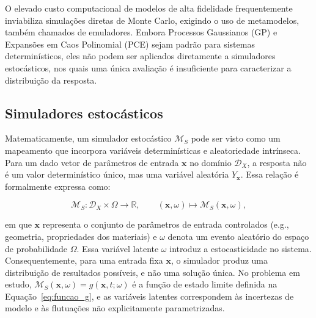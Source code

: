 
O elevado custo computacional de modelos de alta fidelidade frequentemente inviabiliza simulações diretas de Monte Carlo, exigindo o uso de metamodelos, também chamados de emuladores. Embora Processos Gaussianos (GP) \citep{rasmussen2006} e Expansões em Caos Polinomial (PCE) \citep{xiu2002} sejam padrão para sistemas determinísticos, eles não podem ser aplicados diretamente a simuladores estocásticos, nos quais uma única avaliação é insuficiente para caracterizar a distribuição da resposta.

\subsection{Simuladores estocásticos}
\label{subsec:simulador}

Matematicamente, um simulador estocástico $\mathcal{M}_S$ pode ser visto como um mapeamento que incorpora variáveis determinísticas e aleatoriedade intrínseca. Para um dado vetor de parâmetros de entrada $\mathbf{x}$ no domínio $\mathcal{D}_X$, a resposta não é um valor determinístico único, mas uma variável aleatória $Y_{\mathbf{x}}$. Essa relação é formalmente expressa como:

\begin{equation}
\mathcal{M}_S : \mathcal{D}_X \times \Omega \rightarrow \mathbb{R}, \qquad (\mathbf{x}, \omega) \mapsto \mathcal{M}_S(\mathbf{x}, \omega),
\label{eq:simulador_estocastico}
\end{equation}

\noindent em que $\mathbf{x}$ representa o conjunto de parâmetros de entrada controlados (e.g., geometria, propriedades dos materiais) e $\omega$ denota um evento aleatório do espaço de probabilidade $\Omega$. Essa variável latente $\omega$ introduz a estocasticidade no sistema. Consequentemente, para uma entrada fixa $\mathbf{x}$, o simulador produz uma distribuição de resultados possíveis, e não uma solução única. No problema em estudo, $\mathcal{M}_S(\mathbf{x}, \omega) = g(\mathbf{x}, t; \omega)$ é a função de estado limite definida na Equação~\eqref{eq:funcao_g}, e as variáveis latentes correspondem às incertezas de modelo e às flutuações não explicitamente parametrizadas.


